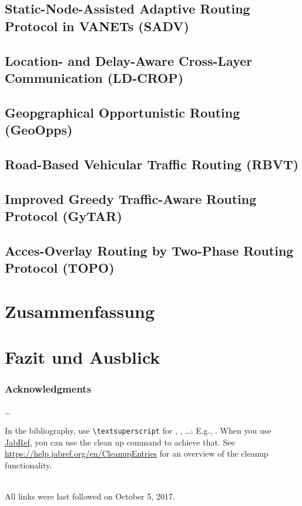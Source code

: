 \documentclass[english,runningheads,a4paper]{llncs}[2018/03/10]
\begin{document}
\subsection{Static-Node-Assisted Adaptive Routing Protocol in VANETs (SADV)}
\subsection{Location- and Delay-Aware Cross-Layer Communication (LD-CROP)}
\subsection{Geopgraphical Opportunistic Routing (GeoOpps)}
\subsection{Road-Based Vehicular Traffic Routing (RBVT)}
\subsection{Improved Greedy Traffic-Aware Routing Protocol (GyTAR)}
\subsection{Acces-Overlay Routing by Two-Phase Routing Protocol (TOPO)}

\section{Zusammenfassung}
\label{sec:summary}

\section{Fazit und Ausblick}
\label{sec:conclusion}

\subsubsection*{Acknowledgments}
\ldots

In the bibliography, use \texttt{\textbackslash textsuperscript} for , , \ldots:
E.g., .
When you use \href{https://www.jabref.org}{JabRef}, you can use the clean up command to achieve that.
See \url{https://help.jabref.org/en/CleanupEntries} for an overview of the cleanup functionality.

\renewcommand{\bibsection}{\section*{References}} %

\begingroup
  \ifluatex
  \else
  \fi
  \small %
  
\endgroup

\ \\
%
All links were last followed on October 5, 2017.
\end{document}
